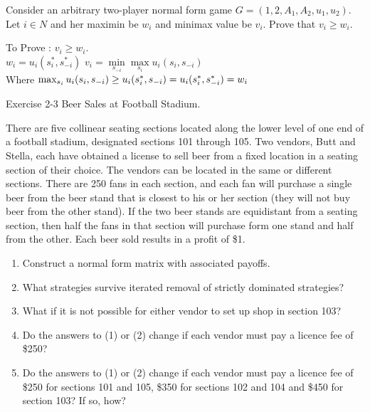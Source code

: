 \documentclass[../main.tex]{subfiles}
\begin{document}
\begin{question}
Consider an arbitrary two-player normal form game $G = ({1,2},{A_1,A_2},{u_1,u_2})$. Let $i \in N$ and her maximin be $w_i$ and minimax value be $v_i$. Prove that $v_i \geq w_i$.
\end{question}

\begin{solution}
 To Prove : $v_i \geq w_i$.\\
 $w_i = u_i(s_{i}^{*},s_{-i}^{*})$
 $v_i = \min\limits_{s_{-i}} \max\limits_{s_i} u_i(s_i,s_{-i})$\\
 	Where $\max_{s_i} u_i(s_i,s_{-i})\\ \geq
 	u_i(s_i^{*}, s_{-i}) = u_i(s_i^{*},s_{-i}^{*}) = w_i$
\end{solution}

\begin{question}
Exercise 2-3 Beer Sales at Football Stadium.

There are five collinear seating sections located along the lower level of one end of a football stadium, designated sections 101 through 105. Two vendors, Butt and Stella, each have obtained a license to sell beer from a fixed location in a seating section of their choice. The vendors can be located in the same or different sections. There are 250 fans in each section, and each fan will purchase a single beer from the beer stand that is closest to his or her section (they will not buy beer from the other stand). If the two beer stands are
equidistant from a seating section, then half the fans in that section will purchase form one stand and half from the other. Each beer sold results in a profit of \$1.

	\begin{enumerate}
		\item Construct a normal form matrix with associated payoffs.
		\item What strategies survive iterated removal of strictly dominated strategies?
		\item What if it is not possible for either vendor to set up shop in section 103?
		\item Do the answers to (1) or (2) change if each vendor must pay a licence fee of \$250?
		\item Do the answers to (1) or (2) change if each vendor must pay a licence fee of \$250 for sections 101 and 105, \$350 for sections 102 and 104 and \$450 for section 103? If so, how?
	\end{enumerate}

\end{question}
\end{document}
